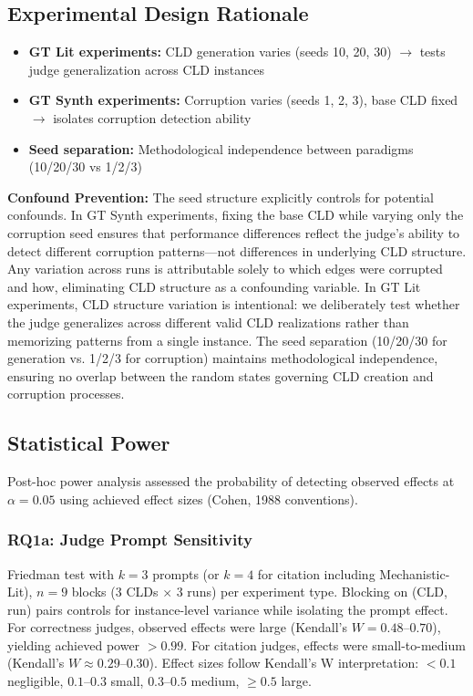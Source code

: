 \subsection{Experimental Design Rationale}
\begin{itemize}[noitemsep]
    \item \textbf{GT Lit experiments:} CLD generation varies (seeds 10, 20, 30) $\rightarrow$ tests judge generalization across CLD instances
    \item \textbf{GT Synth experiments:} Corruption varies (seeds 1, 2, 3), base CLD fixed $\rightarrow$ isolates corruption detection ability
    \item \textbf{Seed separation:} Methodological independence between paradigms (10/20/30 vs 1/2/3)
\end{itemize}

\textbf{Confound Prevention:} The seed structure explicitly controls for potential confounds. In GT Synth experiments, fixing the base CLD while varying only the corruption seed ensures that performance differences reflect the judge's ability to detect different corruption patterns---not differences in underlying CLD structure. Any variation across runs is attributable solely to which edges were corrupted and how, eliminating CLD structure as a confounding variable. In GT Lit experiments, CLD structure variation is intentional: we deliberately test whether the judge generalizes across different valid CLD realizations rather than memorizing patterns from a single instance. The seed separation (10/20/30 for generation vs. 1/2/3 for corruption) maintains methodological independence, ensuring no overlap between the random states governing CLD creation and corruption processes.

\subsection{Statistical Power}

Post-hoc power analysis assessed the probability of detecting observed effects at $\alpha = 0.05$ using achieved effect sizes (Cohen, 1988 conventions).

\subsubsection{RQ1a: Judge Prompt Sensitivity}
Friedman test with $k=3$ prompts (or $k=4$ for citation including Mechanistic-Lit), $n=9$ blocks (3 CLDs $\times$ 3 runs) per experiment type. Blocking on (CLD, run) pairs controls for instance-level variance while isolating the prompt effect. For correctness judges, observed effects were large (Kendall's $W = 0.48$--$0.70$), yielding achieved power $>0.99$. For citation judges, effects were small-to-medium (Kendall's $W \approx 0.29$--$0.30$). Effect sizes follow Kendall's W interpretation: $<0.1$ negligible, $0.1$--$0.3$ small, $0.3$--$0.5$ medium, $\geq 0.5$ large.

